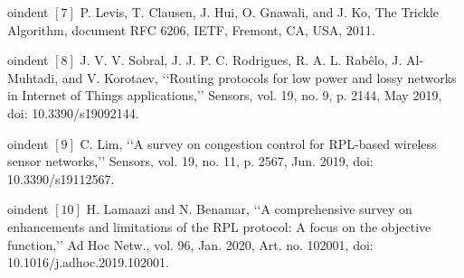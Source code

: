 \documentclass[a4paper]{report}
\begin{document}
\begin{flushleft}
{{oindent    $\left[ 7 \right]$ P. Levis, T. Clausen, J. Hui, O. Gnawali, and J. Ko, The Trickle Algorithm, document RFC 6206, IETF, Fremont, CA, USA, 2011.
    \par \vspace{0.2cm}
    

oindent    $\left[ 8 \right]$ J. V. V. Sobral, J. J. P. C. Rodrigues, R. A. L. Rabêlo, J. Al-Muhtadi, and V. Korotaev, ‘‘Routing protocols for low power and lossy networks in Internet of Things applications,’’ Sensors, vol. 19, no. 9, p. 2144, May 2019, doi: 10.3390/s19092144.
    \par \vspace{0.2cm}   
    

oindent    $\left[ 9 \right]$ C. Lim, ‘‘A survey on congestion control for RPL-based wireless sensor networks,’’ Sensors, vol. 19, no. 11, p. 2567, Jun. 2019, doi: 10.3390/s19112567.
    \par \vspace{0.2cm}
    

oindent    $\left[ 10 \right]$ H. Lamaazi and N. Benamar, ‘‘A comprehensive survey on enhancements and limitations of the RPL protocol: A focus on the objective function,’’ Ad Hoc Netw., vol. 96, Jan. 2020, Art. no. 102001, doi: 10.1016/j.adhoc.2019.102001.
    \par \vspace{0.2cm}   
    
    }}
\end{flushleft}

\end{document}
